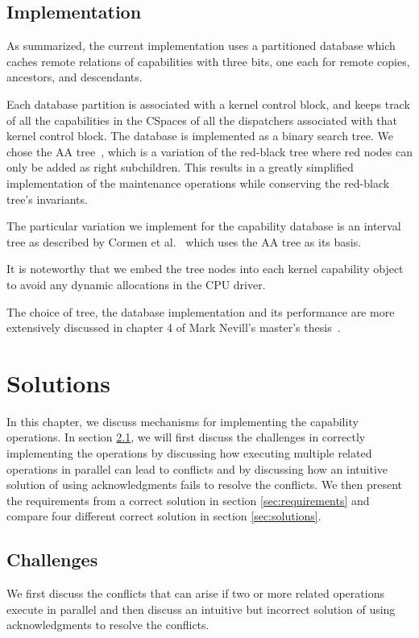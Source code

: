 \documentclass[a4paper,twoside]{report} %
\begin{document}
\section{Implementation}

As summarized, the current implementation uses a partitioned database which
caches remote relations of capabilities with three bits, one each for remote
copies, ancestors, and descendants.

Each database partition is associated with a kernel control block, and keeps
track of all the capabilities in the CSpaces of all the dispatchers associated
with that kernel control block.
The database is implemented as a binary search tree.
We chose the AA tree~\cite{Andersson1993}, which is a variation of the
red-black tree where red nodes can only be added as right subchildren.
This results in a greatly simplified implementation of the maintenance
operations while conserving the red-black tree's invariants.

The particular variation we implement for the capability database is an
interval tree as described by
Cormen et al.~\cite[section~14.3, pp~348-354]{Cormen2001} which uses the AA
tree as its basis.

It is noteworthy that we embed the tree nodes into each kernel capability
object to avoid any dynamic allocations in the CPU driver.

The choice of tree, the database implementation and its performance are more
extensively discussed in chapter 4 of Mark Nevill's master's
thesis~\cite{Nevill2012}.


\chapter{Solutions}\label{chap:solutions}
In this chapter, we discuss mechanisms for implementing the capability
operations. In section \ref{sec:challenges}, we will first discuss the
challenges in correctly implementing the operations by discussing how
executing multiple related operations in parallel can lead to
conflicts and by discussing how an intuitive solution of using
acknowledgments fails to resolve the conflicts. We then present the
requirements from a correct solution in section \ref{sec:requirements}
and compare four different correct solution in section
\ref{sec:solutions}.

\section{Challenges}\label{sec:challenges}
We first discuss the conflicts that can arise if two or more related
operations execute in parallel and then discuss an intuitive but
incorrect solution of using acknowledgments to resolve the conflicts.
\end{document}
